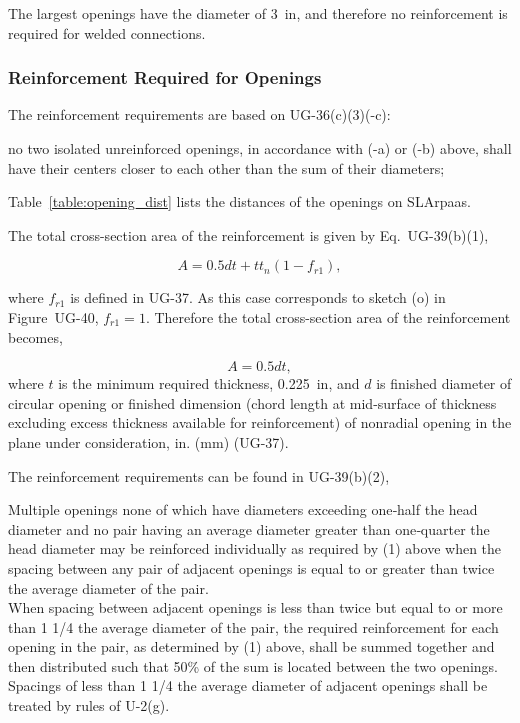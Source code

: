 The largest openings have the diameter of 3~in, 
and therefore no reinforcement is required for welded connections.

\subsubsection{Reinforcement Required for Openings}
\label{app:opening_reinforcement}

The reinforcement requirements are based on UG-36(c)(3)(-c):

\begin{displayquote}
    no two isolated unreinforced openings, in accordance with (-a) 
    or (-b) above, shall have their centers closer to each other than 
    the sum of their diameters;
\end{displayquote}

Table~\ref{table:opening_dist} lists the distances of the openings on SLArpaas.



The total cross-section area of the reinforcement is given by 
Eq.~UG-39(b)(1),

\begin{equation}
    A = 0.5dt + tt_n(1-f_{r1}),
\end{equation}

where $f_{r1}$ is defined in UG-37. 
As this case corresponds to sketch (o) in Figure~UG-40,
$f_{r1} = 1$.
Therefore the total cross-section area of the reinforcement becomes,

\begin{equation}
    A = 0.5dt,
\end{equation}
where $t$ is the minimum required thickness, 0.225~in,
and $d$ is finished diameter of circular opening or finished dimension 
(chord length at mid-surface of thickness excluding excess thickness 
available for reinforcement) of nonradial opening in the plane under 
consideration, in. (mm) (UG-37).

The reinforcement requirements can be found in UG-39(b)(2),

\begin{displayquote}
    Multiple openings none of which have diameters exceeding one‐half 
    the head diameter and no pair having an average diameter greater 
    than one‐quarter the head diameter may be reinforced individually 
    as required by (1) above when the spacing between any pair of 
    adjacent openings is equal to or greater than twice the average 
    diameter of the pair.\\

    When spacing between adjacent openings is less than twice but equal 
    to or more than 1 1/4 the average diameter of the pair, the required 
    reinforcement for each opening in the pair, as determined by (1) 
    above, shall be summed together and then distributed such that 50\% 
    of the sum is located between the two openings. 
    Spacings of less than 1 1/4 the average diameter of adjacent openings 
    shall be treated by rules of U-2(g).
\end{displayquote}

